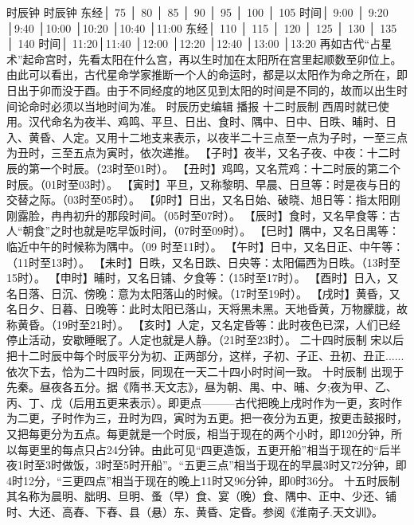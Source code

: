 时辰钟
时辰钟
东经│ 75 │ 80 │ 85 │ 90 │ 95 │ 100 │ 105
时间│ 9:00 │ 9:20 │9:40 │10:00 │10:20 │10:40 │11:00
东经│ 110 │ 115 │ 120 │ 125 │ 130 │ 135 │ 140
时间│ 11:20│11:40 │12:00 │12:20 │12:40 │13:00 │13:20
再如古代“占星术”起命宫时，先看太阳在什么宫，再以生时加在太阳所在宫里起顺数至卯位上。由此可以看出，古代星命学家推断一个人的命运时，都是以太阳作为命之所在，即日出于卯而没于酉。由于不同经度的地区见到太阳的时间是不同的，故而以出生时间论命时必须以当地时间为准。
时辰历史编辑 播报
十二时辰制
西周时就已使用。汉代命名为夜半、鸡鸣、平旦、日出、食时、隅中、日中、日昳、晡时、日入、黄昏、人定。又用十二地支来表示，以夜半二十三点至一点为子时，一至三点为丑时，三至五点为寅时，依次递推。
【子时】夜半，又名子夜、中夜：十二时辰的第一个时辰。（23时至01时）。
【丑时】鸡鸣，又名荒鸡：十二时辰的第二个时辰。（01时至03时）。
【寅时】平旦，又称黎明、早晨、日旦等：时是夜与日的交替之际。（03时至05时）。
【卯时】日出，又名日始、破晓、旭日等：指太阳刚刚露脸，冉冉初升的那段时间。（05时至07时）。
【辰时】食时，又名早食等：古人“朝食”之时也就是吃早饭时间，（07时至09时）。
【巳时】隅中，又名日禺等：临近中午的时候称为隅中。（09 时至11时）。
【午时】日中，又名日正、中午等：（11时至13时）。
【未时】日昳，又名日跌、日央等：太阳偏西为日昳。（13时至15时）。
【申时】晡时，又名日铺、夕食等：（15时至17时）。
【酉时】日入，又名日落、日沉、傍晚：意为太阳落山的时候。（17时至19时）。
【戌时】黄昏，又名日夕、日暮、日晚等：此时太阳已落山，天将黑未黑。天地昏黄，万物朦胧，故称黄昏。（19时至21时）。
【亥时】人定，又名定昏等：此时夜色已深，人们已经停止活动，安歇睡眠了。人定也就是人静。（21时至23时）。
二十四时辰制
宋以后把十二时辰中每个时辰平分为初、正两部分，这样，子初、子正、丑初、丑正......依次下去，恰为二十四时辰，同现在一天二十四小时时间一致。
十时辰制
出现于先秦。昼夜各五分。据《隋书.天文志》，昼为朝、禺、中、晡、夕;夜为甲、乙、丙、丁、戊（后用五更来表示）。即更点———古代把晚上戌时作为一更，亥时作为二更，子时作为三，丑时为四，寅时为五更。把一夜分为五更，按更击鼓报时，又把每更分为五点。每更就是一个时辰，相当于现在的两个小时，即120分钟，所以每更里的每点只占24分钟。由此可见“四更造饭，五更开船”相当于现在的“后半夜1时至3时做饭，3时至5时开船”。“五更三点”相当于现在的早晨3时又72分钟，即4时12分，“三更四点”相当于现在的晚上11时又96分钟，即0时36分。
十五时辰制
其名称为晨明、朏明、旦明、蚤（早）食、宴（晚）食、隅中、正中、少还、铺时、大还、高舂、下舂、县（悬）东、黄昏、定昏。参阅《淮南子.天文训》。
